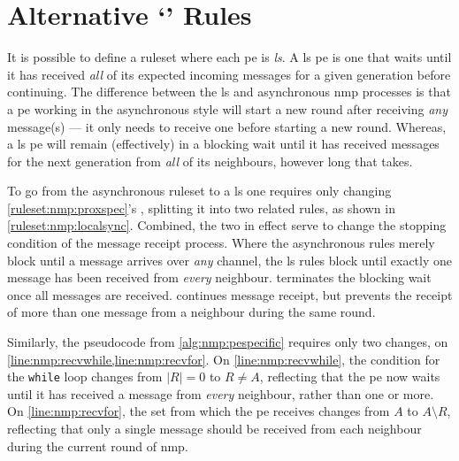 \section{\label{sec:nmp:localsync}Alternative `' Rules}
It is possible to define a \gls{ruleset} where each \gls{pe} is \emph{\gls{ls}}.  A \gls{ls} \gls{pe} is one that waits until it has received \emph{all} of its expected incoming messages for a given generation before continuing.  The difference between the \gls{ls} and asynchronous \gls{nmp} processes is that a \gls{pe} working in the asynchronous style will start a new round after receiving \emph{any} message(s) --- it only needs to receive one before starting a new round.  Whereas, a \gls{ls} \gls{pe} will remain (effectively) in a blocking wait until it has received messages for the next generation from \emph{all} of its neighbours, however long that takes.

To go from the asynchronous \gls{ruleset} to a \gls{ls} one requires only changing \cref{ruleset:nmp:proxspec}'s , splitting it into two related rules, as shown in \cref{ruleset:nmp:localsync}.  Combined, the two in effect serve to change the stopping condition of the message receipt process.  Where the asynchronous rules merely block until a message arrives over \emph{any} channel, the \gls{ls} rules block until exactly one message has been received from \emph{every} neighbour.   terminates the blocking wait once all messages are received.   continues message receipt, but prevents the receipt of more than one message from a neighbour during the same round.

Similarly, the pseudocode from \cref{alg:nmp:pespecific} requires only two changes, on \cref{line:nmp:recvwhile,line:nmp:recvfor}.  On \cref{line:nmp:recvwhile}, the condition for the \texttt{while} loop changes from \(|R| = 0\) to \(R \not= A\), reflecting that the \gls{pe} now waits until it has received a message from \emph{every} neighbour, rather than one or more.  On \cref{line:nmp:recvfor}, the set from which the \gls{pe} receives changes from \(A\) to \(A \setminus R\), reflecting that only a single message should be received from each neighbour during the current round of \gls{nmp}.

